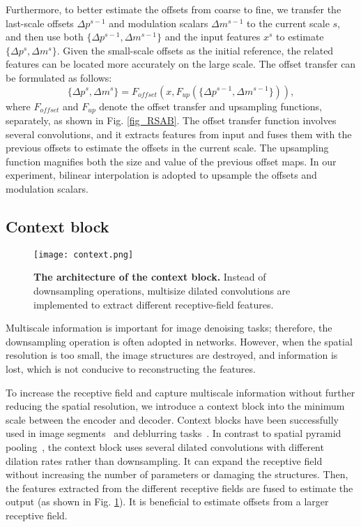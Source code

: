 \documentclass[runningheads]{llncs}
\begin{document}
Furthermore, to better estimate the offsets from coarse to fine, we transfer the last-scale offsets $\Delta p^{s-1}$ and modulation scalars $\Delta m^{s-1}$ to the current scale $s$, and then use both $\{\Delta p^{s-1}, \Delta m^{s-1}\}$ and the input features $x^s$ to estimate $\{\Delta p^s, \Delta m^s\}$. Given the small-scale offsets as the initial reference, the related features can be located more accurately on the large scale. The offset transfer can be formulated as follows:
\begin{equation}
    \{\Delta p^s, \Delta m^s\} = F_{offset}(x, F_{up}(\{\Delta p^{s-1}, \Delta m^{s-1}\})),
\end{equation}
where $F_{offset}$ and $F_{up}$ denote the offset transfer and upsampling functions, separately, as shown in Fig. \ref{fig_RSAB}. The offset transfer function involves several convolutions, and it extracts features from input and fuses them with the previous offsets to estimate the offsets in the current scale. The upsampling function magnifies both the size and value of the previous offset maps. In our experiment, bilinear interpolation is adopted to upsample the offsets and modulation scalars.

\subsection{Context block}

\begin{figure}[t]
\begin{center}
\texttt{[image: context.png]}
\end{center}
\setlength{\abovecaptionskip}{0.cm}
   \caption{\textbf{The architecture of the context block.} Instead of downsampling operations, multisize dilated convolutions are implemented to extract different receptive-field features.}
\label{fig_context}
\end{figure}

Multiscale information is important for image denoising tasks; therefore, the downsampling operation is often adopted in networks. However, when the spatial resolution is too small, the image structures are destroyed, and information is lost, which is not conducive to reconstructing the features.

To increase the receptive field and capture multiscale information without further reducing the spatial resolution, we introduce a context block into the minimum scale between the encoder and decoder. Context blocks have been successfully used in image segments~\cite{chen2017rethinking} and deblurring tasks~\cite{zhou2019davanet}. In contrast to spatial pyramid pooling~\cite{he2015spatial}, the context block uses several dilated convolutions with different dilation rates rather than downsampling. 
It can expand the receptive field without increasing the number of parameters or damaging the structures. Then, the features extracted from the different receptive fields are fused to estimate the output (as shown in Fig. \ref{fig_context}). It is beneficial to estimate offsets from a larger receptive field. 
\end{document}
